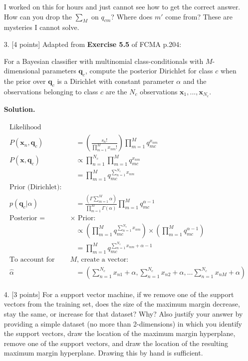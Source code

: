 \documentclass[10pt]{article}
\begin{document}
\begin{itemize}
I worked on this for hours and just cannot see how to get the correct answer. How can you drop the $\sum_M$ on $q_{cm}$? Where does $m'$ come from? These are mysteries I cannot solve.

\item[3.]  [4 points]  
Adapted from {\bf Exercise 5.5} of FCMA p.204:

For a Bayesian classifier with multinomial class-conditionals with $M$-dimensional parameters $\mathbf{q}_c$, compute the posterior Dirichlet for class $c$ when the prior over $\mathbf{q}_c$ is a Dirichlet with constant parameter $\alpha$ and the observations belonging to class $c$ are the $N_c$ observations $\mathbf{x}_1, ..., \mathbf{x}_{N_c}$.

{\bf Solution.} %

\begin{eqnarray*}
\begin{aligned}
\text{Likelihood (multinomial):}
\\
P(\mathbf{x}_n, \mathbf{q}_c) &= \left( \frac{s_n!}{\prod_{m=1}^M x_{nm}! } \right) \prod_{m=1}^M q_{mc}^{x_{nm}}
\\
P(\mathbf{x}, \mathbf{q}_c) &\propto \prod_{n=1}^{N_c} \prod_{m=1}^M q_{mc}^{x_{nm}}
\\
&= \prod_{m=1}^M q_{mc}^{\sum_{n=1}^{N_c} x_{nm}}
\\
\text{Prior (Dirichlet):}
\\
p(\mathbf{q}_c | \alpha ) &= \frac{ \left( \Gamma \sum_{m=1}^M \alpha \right) }{ \prod_{m=1}^M \Gamma(\alpha) }
\prod_{m=1}^M q_{mc}^{\alpha - 1}
\\
\text{Posterior = Likelihood $\times$ Prior:}
\\
&\propto \left( \prod_{m=1}^M q_{mc}^{\sum_{n=1}^{N_c} x_{nm}} \right) 
\times
\left( \prod_{m=1}^M q_{mc}^{\alpha - 1} \right)
\\
&= \prod_{m=1}^M q_{mc}^{\sum_{n=1}^{N_c} x_{nm} + \alpha - 1}
\\
\text{To account for each dimension in $M$, create a vector:}
\\
\hat{\alpha} &= \left( 
\sum_{n=1}^{N_c} x_{n1} + \alpha, 
\sum_{n=1}^{N_c} x_{n2} + \alpha,
\dots
\sum_{n=1}^{N_c} x_{nM} + \alpha
\right)
\end{aligned}
\end{eqnarray*}

\item[4.]  [3 points]
For a support vector machine, if we remove one of the support vectors from the training set, does the size of the maximum margin decrease, stay the same, or increase for that dataset?  Why?  Also justify your answer by providing a simple dataset (no more than 2-dimensions) in which you identify the support vectors, draw the location of the maximum margin hyperplane, remove one of the support vectors, and draw the location of the resulting maximum margin hyperplane.  Drawing this by hand is sufficient.


\end{itemize}
\end{document}
